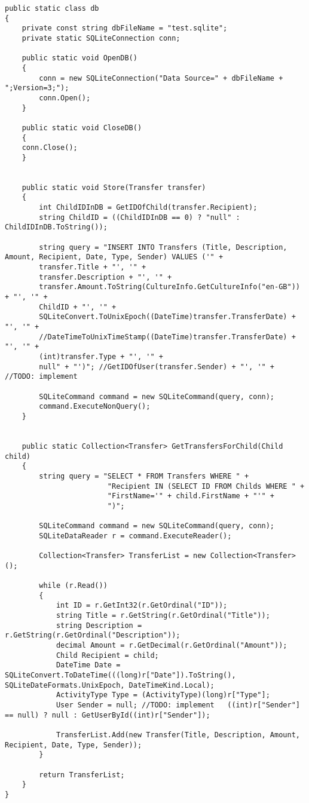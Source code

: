 \begin{lstlisting}[caption={Statisk klasse, der forbinder til den relationelle database SQLite},label={lst:sqlite}]
public static class db
{
	private const string dbFileName = "test.sqlite";
	private static SQLiteConnection conn;

	public static void OpenDB()
	{
		conn = new SQLiteConnection("Data Source=" + dbFileName + ";Version=3;");
		conn.Open();
	}

	public static void CloseDB()
	{
	conn.Close();
	}


	public static void Store(Transfer transfer)
	{
		int ChildIDInDB = GetIDOfChild(transfer.Recipient);
		string ChildID = ((ChildIDInDB == 0) ? "null" : ChildIDInDB.ToString());

		string query = "INSERT INTO Transfers (Title, Description, Amount, Recipient, Date, Type, Sender) VALUES ('" +
		transfer.Title + "', '" +
		transfer.Description + "', '" +
		transfer.Amount.ToString(CultureInfo.GetCultureInfo("en-GB")) + "', '" +
		ChildID + "', '" +
		SQLiteConvert.ToUnixEpoch((DateTime)transfer.TransferDate) + "', '" +
		//DateTimeToUnixTimeStamp((DateTime)transfer.TransferDate) + "', '" +
		(int)transfer.Type + "', '" +
		null" + "')"; //GetIDOfUser(transfer.Sender) + "', '" +   //TODO: implement

		SQLiteCommand command = new SQLiteCommand(query, conn);
		command.ExecuteNonQuery();
	}


	public static Collection<Transfer> GetTransfersForChild(Child child)
	{
		string query = "SELECT * FROM Transfers WHERE " +
						"Recipient IN (SELECT ID FROM Childs WHERE " +
						"FirstName='" + child.FirstName + "'" +
						")";

		SQLiteCommand command = new SQLiteCommand(query, conn);
		SQLiteDataReader r = command.ExecuteReader();

		Collection<Transfer> TransferList = new Collection<Transfer>();

		while (r.Read())
		{
			int ID = r.GetInt32(r.GetOrdinal("ID"));
			string Title = r.GetString(r.GetOrdinal("Title"));
			string Description = r.GetString(r.GetOrdinal("Description"));
			decimal Amount = r.GetDecimal(r.GetOrdinal("Amount"));
			Child Recipient = child;
			DateTime Date = SQLiteConvert.ToDateTime(((long)r["Date"]).ToString(), SQLiteDateFormats.UnixEpoch, DateTimeKind.Local);
			ActivityType Type = (ActivityType)(long)r["Type"];
			User Sender = null; //TODO: implement   ((int)r["Sender"] == null) ? null : GetUserById((int)r["Sender"]);

			TransferList.Add(new Transfer(Title, Description, Amount, Recipient, Date, Type, Sender));
		}

		return TransferList;
	}
}
\end{lstlisting}